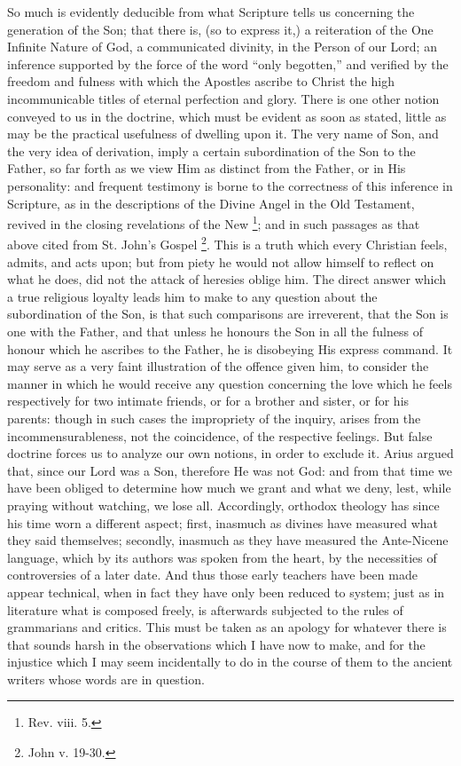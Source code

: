 So much is evidently deducible from what Scripture tells us
concerning the generation of the Son; that there is, (so to express
it,) a reiteration of the One Infinite Nature of God, a communicated
divinity, in the Person of our Lord; an inference supported by the
force of the word ``only begotten,'' and verified by the
freedom and fulness with which the Apostles ascribe to Christ the high
incommunicable titles of eternal perfection and glory. There is one
other notion conveyed to us in the doctrine, which must be evident as
soon as stated, little as may be the practical usefulness of dwelling
upon it. The very name of Son, and the very idea of derivation, imply
a certain subordination of the Son to the Father, so far forth as we
view Him as distinct from the Father, or in His personality: and
frequent testimony is borne to the correctness of this inference in
Scripture, as in the descriptions of the Divine Angel in the Old
Testament, revived in the closing revelations of the New \footnote{Rev. viii. 5.}; and in such passages as that above cited from St. John's
Gospel \footnote{John v. 19-30.}. This is a
truth which every Christian feels, admits, and acts upon; but from
piety he would not allow himself to reflect on what he does, did not
the attack of heresies oblige him. The direct answer which a true
religious loyalty leads him to make to any question about the
subordination of the Son, is that such comparisons are irreverent,
that the Son is one with the Father, and that unless he honours the
Son in all the fulness of honour which he ascribes to the Father, he
is disobeying His express command. It may serve as a very faint
illustration of the offence given him, to consider the manner in which
he would receive any question concerning the love which he feels
respectively for two intimate friends, or for a brother and sister, or
for his parents: though in such cases the impropriety of the inquiry,
arises from the incommensurableness, not the coincidence, of the
respective feelings. But false doctrine forces us to analyze our own
notions, in order to exclude it. Arius argued that, since our Lord was
a Son, therefore He was not God: and from that time we have been
obliged to determine how much we grant and what we deny, lest, while
praying without watching, we lose all. Accordingly, orthodox theology
has since his time worn a different aspect; first, inasmuch as divines
have measured what they said themselves; secondly, inasmuch as they
have measured the Ante-Nicene language, which by its authors was
spoken from the heart, by the necessities of controversies of a later
date. And thus those early teachers have been made appear technical,
when in fact they have only been reduced to system; just as in
literature what is composed freely, is afterwards subjected to the
rules of grammarians and critics. This must be taken as an apology for
whatever there is that sounds harsh in the observations which I have
now to make, and for the injustice which I may seem incidentally to do
in the course of them to the ancient writers whose words are in
question.

